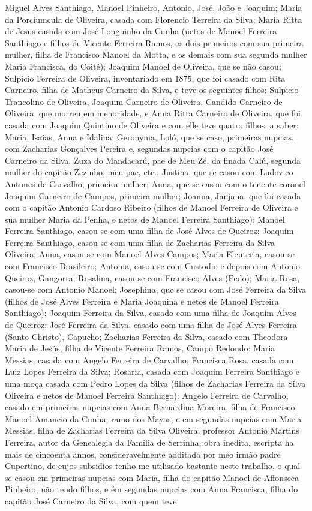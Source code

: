 Miguel Alves Santhiago, Manoel Pinheiro, Antonio, José, João e Joaquim; Maria da Porciumcula de Oliveira, casada com Florencio Terreira da Silva; Maria Ritta de Jesus casada com José Longuinho da Cunha (netos de Manoel Ferreira Santhiago e filhos de Vicente Ferreira Ramos, os dois primeiros com sua primeira mulher, filha de Francisco Manoel da Motta, e os demais com sua segunda mulher Maria Francisca, do Coité); Joaquim Manoel de Oliveira, que se não casou; Sulpicio Ferreira de Oliveira, inventariado em 1875, que foi casado com Rita Carneiro, filha de Matheus Carneiro da Silva, e teve os seguintes filhos: Sulpicio Trancolino de Oliveira,
Joaquim Carneiro de Oliveira, Candido Carneiro de Oliveira, que morreu em menoridade, e Anna Ritta Carneiro de Oliveira, que foi casada com Joaquim Quintino de Oliveira e com elle teve quatro filhos, a saber: Maria, Isaias, Anna e Idalina; Geronyma, Loló, que se caso, primeiras nupcias, com Zacharias Gonçalves Pereira e, segundas nupcias com o capitão José Carneiro da Silva, Zuza do Mandacarú, pae de Meu Zé, da finada Calú, segunda mulher do capitão Zezinho, meu pae, etc.; Justina, que se casou com Ludovico Antunes de Carvalho, primeira mulher; Anna, que se casou com o tenente coronel Joaquim Carneiro de Campos, primeira mulher; Joanna, Janjana, que foi casada com o capitão Antonio Cardoso Ribeiro (filhos de Manoel Ferreira de Oliveira e sua mulher Maria da Penha\label{mpenha}, e netos de Manoel Ferreira Santhiago); Manoel Ferreira Santhiago, casou-se com uma filha de José Alves de Queiroz; Joaquim Ferreira Santhiago, casou-se com uma filha de Zacharias Ferreira da Silva Oliveira; Anna, casou-se com Manoel Alves Campos; Maria Eleuteria\label{maleuteria}, casou-se com Francisco Brasileiro; Antonia, casou-se com Custodio e depois com Antonio Queiroz, Gangorra; Rosalina, casou-se com Francisco Alves (Pedo); Maria Rosa, casou-se com Antonio Manoel; Josephina\label{josephina}, que se casou com José Ferreira da Silva (filhos de José Alves Ferreira e Maria Joaquina e netos de Manoel Ferreira Santhiago); Joaquim Ferreira da Silva, casado com uma filha de Joaquim Alves de Queiroz; José Ferreira da Silva, casado com uma filha de José Alves Ferreira (Santo Christo), Capucho; Zacharias Ferreira da Silva, casado com Theodora Maria de Jesús, filha de Vicente Ferreira Ramos, Campo Redondo: Maria Messias, casada com Angelo Ferreira de Carvalho; Francisca Rosa, casada com Luiz Lopes Ferreira da Silva; Rosaria, casada com Joaquim Ferreira Santhiago e uma moça casada com Pedro Lopes da Silva (filhos de Zacharias Ferreira da Silva Oliveira e netos de Manoel Ferreira Santhiago): Angelo Ferreira de Carvalho, casado em primeiras nupcias com Anna Bernardina Moreira, filha de Francisco Manoel Amancio da Cunha, ramo dos Mayas, e em segundas nupcias com Maria Messias, filha de Zacharias Ferreira da Silva Oliveira; professor Antonio Martins Ferreira, autor da Genealegia da Familia de Serrinha, obra inedita, escripta ha mais de cincoenta annos, consideravelmente additada por meo irmão padre Cupertino, de cujos subsidios tenho me utilisado bastante neste trabalho, o qual se casou em primeiras nupcias com Maria, filha do capitão Manoel de Affonseca Pinheiro, não tendo filhos, e ém segundas nupcias com Anna Francisca, filha do capitão José Carneiro da Silva, com quem teve 